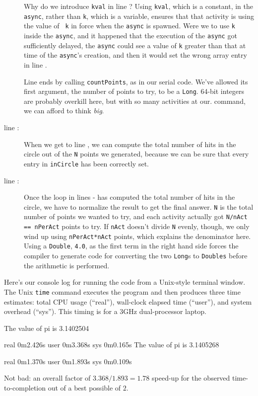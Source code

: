 \begin{description}
Why do we introduce {\tt kval} in line ?
Using {\tt kval}, which is a constant,  in
the {\tt async}, rather than {\tt k}, which is a
variable, ensures that that activity is using the value of {\tt
k} in force when the {\tt async} is spawned.  Were we to use {\tt k} inside the
{\tt async}, and it happened that the execution of the {\tt async} got
sufficiently delayed, the {\tt async} could see a value of {\tt k} greater than
that at time of the {\tt async}'s creation, and then it would set the wrong
array entry in line .

Line    ends by calling {\tt countPoints}, as in our serial code.
We've allowed its first argument, the number of points to try, to be a {\tt Long}.
64-bit integers are probably overkill here, but with so many activities at our.
command, we can afford to think {\em big}.

\item[line \xlref{mpia-for2}{15}: ]
When we get to line , we can compute the total number
of hits in the circle out of the {\tt N} points we generated, because we can be sure that every entry in {\tt inCircle} has been correctly set.  

\item[line \xlref{mpia-pi}{20}: ]
Once the loop in lines -
has computed the total number of hits in the circle, 
we have to normalize the result to get the final answer.  
{\tt N} is the total number of points
we wanted to try, and each activity actually got {\tt N/nAct == nPerAct}
 points to try.
If {\tt nAct} doesn't divide {\tt N} evenly, though, we only wind up using
{\tt nPerAct*nAct} points, which explains the denominator here.
Using a {\tt Double}, {\tt 4.0}, as the first term in the right hand side forces
the compiler to generate code for converting the two {\tt Long}s to {\tt Doubles} before
the arithmetic is performed.
\end{description}

Here's our console log for running the code from a Unix-style terminal window.
The Unix {\tt time} command
executes the program and then produces three time estimates: total CPU usage (``real''),
wall-clock elapsed time (``user''), and system overhead (``sys'').
This timing is for a 3GHz dual-processor laptop.   
\begin{xten}
The value of pi is 3.1402504

real	0m2.426s
user	0m3.368s
sys	0m0.165s
The value of pi is 3.1405268

real	0m1.370s
user	0m1.893s
sys	0m0.109s
\end{xten}
Not bad: an overall factor of  $3.368/1.893 = 1.78$ speed-up for the observed time-to-completion
out of a best possible of $2$.  

